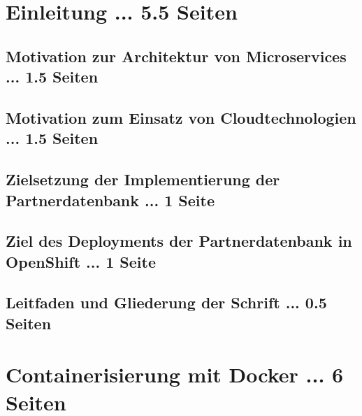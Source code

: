 \documentclass[master,german]{hgbthesis}
\begin{document}

\frontmatter							%


\tableofcontents

%

\mainmatter          			%

\chapter{Einleitung ... 5.5 Seiten}
\section{Motivation zur Architektur von Microservices ... 1.5 Seiten}
\section{Motivation zum Einsatz von Cloudtechnologien ... 1.5 Seiten}
\section{Zielsetzung der Implementierung der Partnerdatenbank ... 1 Seite}
\section{Ziel des Deployments der Partnerdatenbank in OpenShift ... 1 Seite}
\section{Leitfaden und Gliederung der Schrift ... 0.5 Seiten}





\chapter{Containerisierung mit Docker ... 6 Seiten}
\end{document}
